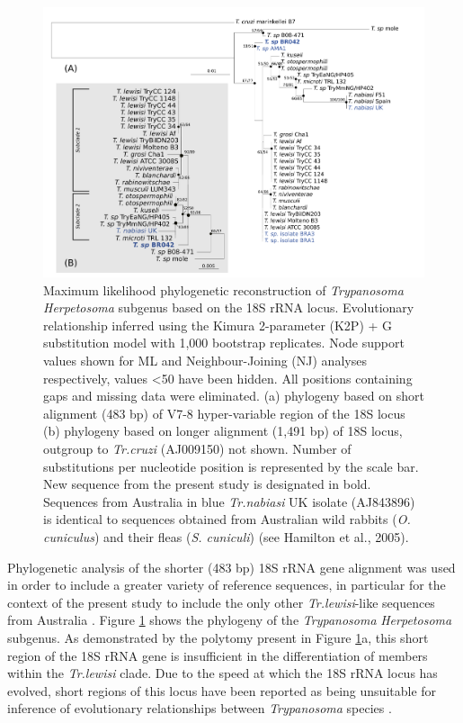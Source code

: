 \documentclass[a4paper, nobind]{templates/ociamthesis}
\begin{document}
\begin{figure}
\includegraphics[width=0.95\linewidth]{figures/ms-figs/Ch5-Fig1} \caption[Phylogeny of \textit{Trypanosoma Herpetosoma} subgenus based on the 18S rRNA locus.]{Maximum likelihood phylogenetic reconstruction of \textit{Trypanosoma Herpetosoma} subgenus based on the 18S rRNA locus. Evolutionary relationship inferred using the Kimura 2-parameter (K2P) + G substitution model with 1,000 bootstrap replicates. Node support values shown for ML and Neighbour-Joining (NJ) analyses respectively, values <50 have been hidden. All positions containing gaps and missing data were eliminated. (a) phylogeny based on short alignment (483 bp) of V7-8 hyper-variable region of the 18S locus (b) phylogeny based on longer alignment (1,491 bp) of 18S locus, outgroup to \textit{Tr.cruzi} (AJ009150) not shown. Number of substitutions per nucleotide position is represented by the scale bar. New sequence from the present study is designated in bold. Sequences from Australia in blue \textit{Tr.nabiasi} UK isolate (AJ843896) is identical to sequences obtained from Australian wild rabbits (\textit{O. cuniculus}) and their fleas (\textit{S. cuniculi}) (see Hamilton et al., 2005).}\label{fig:F51}
\end{figure}

Phylogenetic analysis of the shorter (483 bp) 18S rRNA gene alignment was used in order to include a greater variety of reference sequences, in particular for the context of the present study to include the only other \emph{Tr.lewisi}-like sequences from Australia \autocite{hamiltonInadvertentIntroductionAustralia2005,averisDiversityDistributionHostparasite2009}. Figure \ref{fig:F51} shows the phylogeny of the \emph{Trypanosoma} \emph{Herpetosoma} subgenus. As demonstrated by the polytomy present in Figure \ref{fig:F51}a, this short region of the 18S rRNA gene is insufficient in the differentiation of members within the \emph{Tr.lewisi} clade. Due to the speed at which the 18S rRNA locus has evolved, short regions of this locus have been reported as being unsuitable for inference of evolutionary relationships between \emph{Trypanosoma} species \autocite{hamiltonResolvingRelationshipsAustralian2011}.
\end{document}
